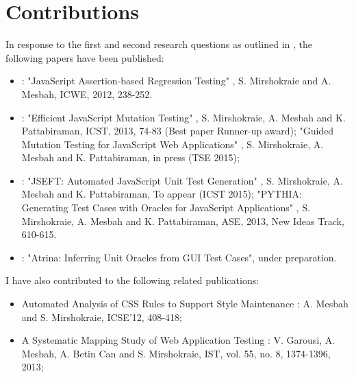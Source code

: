 \section{Contributions} \label{Sec:contrib}
In response to the first and second research questions as outlined in , the following papers have been published:
\begin{itemize}
\item {}: "JavaScript Assertion-based Regression Testing" \cite{mirshokraie:icwe12},
S. Mirshokraie and A. Mesbah, ICWE, 2012, 238-252.
\item {}: "Efficient JavaScript Mutation Testing" \cite{mirshokraie:icst13},
S. Mirshokraie, A. Mesbah and K. Pattabiraman, ICST, 2013, 74-83 (Best paper Runner-up award);
"Guided Mutation Testing for JavaScript Web Applications" \cite{mirshokraie:tse15},
S. Mirshokraie, A. Mesbah and K. Pattabiraman, in press (TSE 2015);
\item {}: "JSEFT: Automated JavaScript Unit Test Generation" \cite{mirshokraie:icst15},
S. Mirshokraie, A. Mesbah and K. Pattabiraman, To appear (ICST 2015); "PYTHIA: Generating Test Cases with Oracles
for JavaScript Applications" \cite{shabnam:ase13},
S. Mirshokraie, A. Mesbah and K. Pattabiraman, ASE, 2013, New Ideas Track, 610-615.
\item {}: "Atrina: Inferring Unit Oracles from GUI Test Cases", under preparation.
\end{itemize}

I have also contributed to the following related publications:
\begin{itemize}
\item Automated Analysis of CSS Rules to Support Style Maintenance \cite{mesbah:icse12}: 
A. Mesbah and S. Mirshokraie, ICSE'12, 408-418;
\item A Systematic Mapping Study of Web Application Testing \cite{garousi:ist13}: 
V. Garousi, A. Mesbah, A. Betin Can and S. Mirshokraie, IST, vol. 55, no. 8, 1374-1396, 2013;
\end{itemize}

